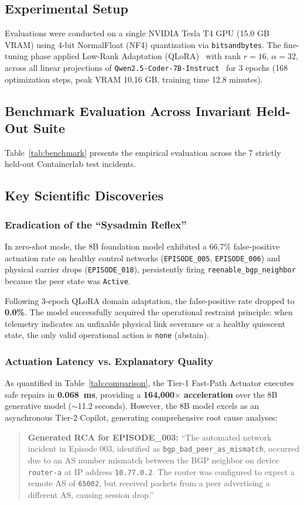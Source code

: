 \documentclass[conference]{IEEEtran}
\begin{document}
\subsection{Experimental Setup}
Evaluations were conducted on a single NVIDIA Tesla T4 GPU (15.0 GB VRAM) using 4-bit NormalFloat (NF4) quantization via \texttt{bitsandbytes}. The fine-tuning phase applied Low-Rank Adaptation (QLoRA)~\cite{dettmers2023qlora} with rank $r=16$, $\alpha=32$, across all linear projections of \texttt{Qwen2.5-Coder-7B-Instruct}~\cite{qwen2024coder} for 3 epochs (168 optimization steps, peak VRAM 10.16 GB, training time 12.8 minutes).

\subsection{Benchmark Evaluation Across Invariant Held-Out Suite}
Table~\ref{tab:benchmark} presents the empirical evaluation across the 7 strictly held-out Containerlab test incidents.

\subsection{Key Scientific Discoveries}

\subsubsection{Eradication of the ``Sysadmin Reflex''}
In zero-shot mode, the 8B foundation model exhibited a 66.7\% false-positive actuation rate on healthy control networks (\texttt{EPISODE\_005}, \texttt{EPISODE\_006}) and physical carrier drops (\texttt{EPISODE\_018}), persistently firing \texttt{reenable\_bgp\_neighbor} because the peer state was \texttt{Active}. 

Following 3-epoch QLoRA domain adaptation, the false-positive rate dropped to \textbf{0.0\%}. The model successfully acquired the operational restraint principle: when telemetry indicates an unfixable physical link severance or a healthy quiescent state, the only valid operational action is \texttt{none} (abstain).

\subsubsection{Actuation Latency vs. Explanatory Quality}
As quantified in Table~\ref{tab:comparison}, the Tier-1 Fast-Path Actuator executes safe repairs in \textbf{0.068~ms}, providing a \textbf{164,000$\times$ acceleration} over the 8B generative model ($\sim$11.2 seconds). However, the 8B model excels as an asynchronous Tier-2 Copilot, generating comprehensive root cause analyses:
\begin{quote}
\small
\textbf{Generated RCA for EPISODE\_003:} ``The automated network incident in Episode 003, identified as \texttt{bgp\_bad\_peer\_as\_mismatch}, occurred due to an AS number mismatch between the BGP neighbor on device \texttt{router-a} at IP address \texttt{10.77.0.2}. The router was configured to expect a remote AS of \texttt{65002}, but received packets from a peer advertising a different AS, causing session drop.''
\end{quote}
\end{document}
